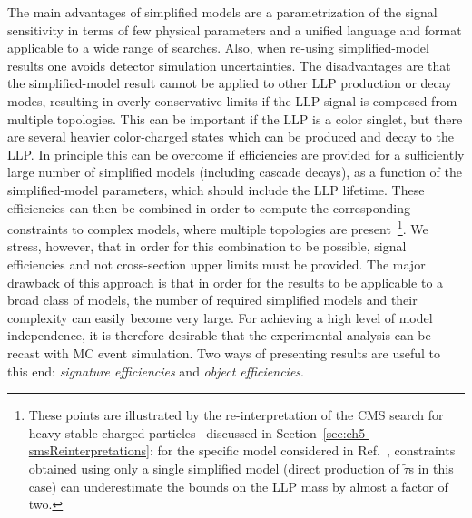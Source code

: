 The main advantages of simplified models are a parametrization of the signal sensitivity in terms of few
physical parameters and a unified language and format applicable to a wide range of searches.
Also, when re-using simplified-model results one avoids detector simulation uncertainties.
The disadvantages are that the simplified-model result
cannot be applied to other LLP production or decay modes, resulting
in overly conservative limits if the LLP signal is composed from
multiple topologies. This can be important if
the LLP is a color singlet, but there are several heavier color-charged states
which can be produced and decay to the LLP.
In principle this can be overcome if efficiencies are provided for a
sufficiently large number of simplified models (including cascade decays), as a
function of the simplified-model parameters, which should include the LLP lifetime.
These efficiencies can then be combined in order to compute the corresponding
constraints to complex models, where multiple topologies are present~\footnote{These points are illustrated by the re-interpretation of the CMS search
for heavy stable charged particles~\cite{Khachatryan:2015lla}
discussed in Section~\ref{sec:ch5-smsReinterpretations}:
for the specific model considered in Ref.~\cite{Heisig:2015yla},
constraints obtained using only a single simplified model (direct production of
$\tilde{\tau}$s in this case) can underestimate the bounds on the LLP mass by almost a factor of two.}.
We stress, however, that in order for this combination to be possible, signal efficiencies and
not cross-section upper limits must be provided.
The major drawback of this approach is that in order for the results to be
applicable to a broad class of models, the number of required simplified models
and their complexity can easily become very large.
For achieving a high level of model independence, it is therefore desirable
that the experimental analysis can be recast with MC event simulation.
Two ways of presenting results are useful to this end: {\it signature efficiencies} and {\it object efficiencies}.

